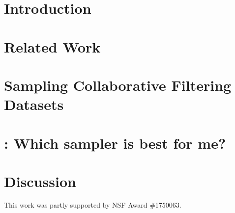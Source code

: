 \section{Introduction} 
\section{Related Work} 
\section{Sampling Collaborative Filtering Datasets} 
\section{\oracle: Which sampler is best for me?} 
\section{Discussion} 

\begin{acks}
This work was partly supported by NSF Award \#1750063.
\end{acks}






